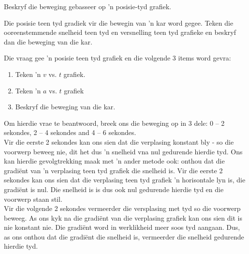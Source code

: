 \begin{wex}{Beskryf die beweging gebasseer op 'n posisie-tyd grafiek.}{Die posisie teen tyd gradiek vir die bewegin van 'n kar word gegee. Teken die ooreenstemmende snelheid teen tyd en versnelling teen tyd grafieke en beskryf dan die beweging van die kar.
\begin{center}
\end{center}
}{%
Die vraag gee 'n posisie teen tyd grafiek en die volgende 3 items word gevra:
\begin{enumerate}[label=\textbf{\arabic*}.]
\item Teken 'n $v$ vs. $t$ grafiek.
\item Teken 'n $a$ vs. $t$ grafiek
\item Beskryf die beweging van die kar.
\end{enumerate}
Om hierdie vrae te beantwoord, breek ons die beweging op in 3 dele: 0 -- 2 sekondes, 2 -- 4 sekondes and 4 -- 6 sekondes.\\

Vir die eerste 2 sekondes kan ons sien dat die verplasing konstant bly - so die voorwerp beweeg nie, dit het dus 'n snelheid vna nul gedurende hierdie tyd. Ons kan hierdie gevolgtrekking maak met 'n ander metode ook: onthou dat die gradi\"ent van 'n verplasing teen tyd grafiek die snelheid is. Vir die eerste 2 sekondes kan ons sien dat die verplasing teen tyd grafiek 'n horisontale lyn is, die gradi\"ent is nul. Die snelheid is is dus ook nul gedurende hierdie tyd en die voorwerp staan stil. \\

Vir die volgende 2 sekondes vermeerder die versplasing met tyd so die voorwerp beweeg. As ons kyk na die gradi\"ent van die verplasing grafiek kan ons sien dit is nie konstant nie. Die gradi\"ent word in werklikheid meer soos tyd aangaan. Dus, as ons onthou dat die gradi\"ent die snelheid is, vermeerder die snelheid gedurende hierdie tyd. \\

}
\end{wex}
